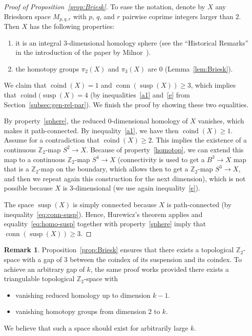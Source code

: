 \documentclass[12pt]{amsart}
\theoremstyle{definition}
\newtheorem{remark}{Remark}
\def\Z{\mathbb{Z}}
\def\K{\mathsf{K}}
\renewcommand{\geq}{\geqslant}
\def\susp{\operatorname{susp}}
\def\conn{\operatorname{conn}}
\def\coind{\operatorname{coind}}
\begin{document}
\begin{proof}[Proof of Proposition~\ref{prop:Briesk}]
To ease the notation, denote by $X$ any Brieskorn space $M_{p,q,r}$ with $p$, $q$, and $r$ pairwise coprime integers larger than $2$. Then $X$ has the following properties:
\begin{enumerate}[label=(\alph*)]
    \item\label{sphere} it is an integral $3$-dimensional homology sphere (see the ``Historical Remarks'' in the introduction of the paper by Milnor~\cite{milnor1975}).
    \item\label{homotop} the homotopy groups $\pi_2(X)$ and $\pi_3(X)$ are $0$ (Lemma~\ref{lem:Briesk}).
\end{enumerate}


We claim that $\coind(X)=1$ and $\conn(\susp(X))\geq 3$, which implies that $\coind(\susp(X) = 4$ (by inequalities~\eqref{a1} and~\eqref{e} from Section~\ref{subsec:gen-rel-par}). %
We finish the proof by showing these two equalities.

 By property~\ref{sphere}, the reduced $0$-dimensional homology of $X$ vanishes, which makes it path-connected. By inequality~\eqref{a1}, we have then $\coind(X) \geq 1$. Assume for a contradiction that $\coind(X) \geq 2$. This implies the existence of a continuous $\Z_2$-map $S^2 \rightarrow X$. Because of property~\ref{homotop}, we can extend this map to a continuous $\Z_2$-map $S^4 \rightarrow X$ (connectivity is used to get a $B^3\rightarrow X$ map that is a $\Z_2$-map on the boundary, which allows then to get a $\Z_2$-map $S^3\rightarrow X$, and then we repeat again this construction for the next dimension), which is not possible because $X$ is $3$-dimensional (we use again inequality~\eqref{e}).

The space $\susp(X)$ is simply connected because $X$ is path-connected (by inequality~\eqref{eq:conn-susp}). Hence, Hurewicz's theorem applies and equality~\eqref{eq:homo-susp} together with property~\ref{sphere} imply that $\conn(\susp(X))\geq 3$. 
\end{proof}

\begin{remark}\label{rem:coind-susp}
Proposition~\ref{prop:Briesk} ensures that there exists a topological $\Z_2$-space with a gap of $3$ between the coindex of its suspension and its coindex. To achieve an arbitrary gap of $k$, the same proof works provided there exists a triangulable topological $\Z_2$-space with
\begin{itemize}
    \item vanishing reduced homology up to dimension $k-1$.
    \item vanishing homotopy groups from dimension $2$ to $k$.
\end{itemize}
We believe that such a space should exist for arbitrarily large $k$.
\end{remark}
\end{document}
